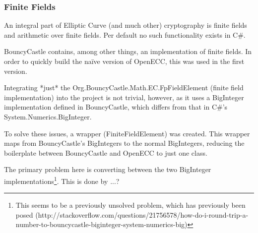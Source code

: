 \subsubsection{Finite Fields}

An integral part of Elliptic Curve (and much other) cryptography is finite fields and arithmetic
over finite fields. Per default no such functionality exists in C\#.

BouncyCastle contains, among other things, an implementation of finite fields. In order to quickly
build the naïve version of OpenECC, this was used in the first version.

Integrating *just* the Org.BouncyCastle.Math.EC.FpFieldElement (finite field implementation) into
the project is not trivial, however, as it uses a BigInteger implementation defined in BouncyCastle,
which differs from that in C\#'s System.Numerics.BigInteger.

To solve these issues, a wrapper (FiniteFieldElement) was created. This wrapper maps from BouncyCastle's
BigIntegers to the normal BigIntegers, reducing the boilerplate between BouncyCastle and OpenECC to
just one class.

The primary problem here is converting between the two BigInteger implementations\footnote{This seems
to be a previously unsolved problem, which has previously been posed (http://stackoverflow.com/questions/21756578/how-do-i-round-trip-a-number-to-bouncycastle-biginteger-system-numerics-big)}.
This is done by ...?